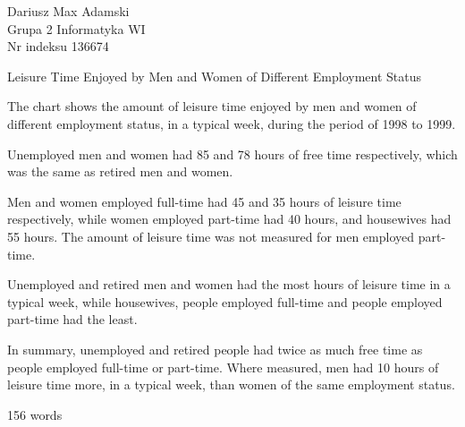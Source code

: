 \documentclass[12pt]{article}
\begin{document}
\begin{flushleft} 
	Dariusz Max Adamski \\
	Grupa 2 Informatyka WI\\
	Nr indeksu 136674
\end{flushleft}

\begin{center} 
	\vspace{0.8cm} \Large 
	Leisure Time Enjoyed by Men and Women of Different Employment Status
	\vspace{0.5cm}
\end{center}

The chart shows the amount of leisure time enjoyed by men and women of different employment status, in a typical week, during the period of 1998 to 1999.

Unemployed men and women had 85 and 78 hours of free time respectively, which was the same as retired men and women.

Men and women employed full-time had 45 and 35 hours of leisure time respectively, while women employed part-time had 40 hours, and housewives had 55 hours. The amount of leisure time was not measured for men employed part-time.

Unemployed and retired men and women had the most hours of leisure time in a typical week, while housewives, people employed full-time and people employed part-time had the least.

In summary, unemployed and retired people had twice as much free time as people employed full-time or part-time. Where measured, men had 10 hours of leisure time more, in a typical week, than women of the same employment status. 

156 words
\end{document}
